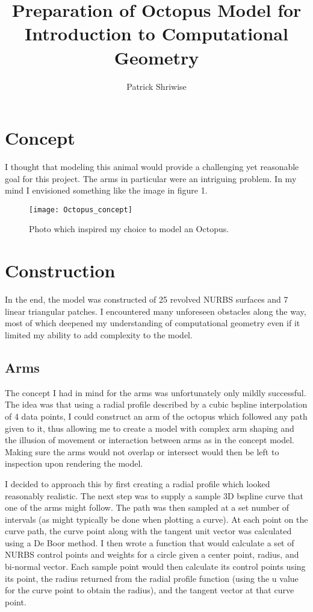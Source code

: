 \documentclass[twocolumn]{article}
\begin{document}
\author{Patrick Shriwise}
\title{Preparation of Octopus Model for Introduction to Computational Geometry	}
\maketitle


\section{Concept}

I thought that modeling this animal would provide a challenging yet reasonable goal for this project. The arms in particular were an intriguing problem. In my mind I envisioned something like the image in figure 1. 

\begin{figure}[h!]
\begin{center}
\texttt{[image: Octopus\_concept]}
\end{center}
\caption{Photo which inspired my choice to model an Octopus.}
\end{figure}


\section{Construction}

In the end, the model was constructed of 25 revolved NURBS surfaces and 7 linear triangular patches. I encountered many unforeseen obstacles along the way, most of which deepened my understanding of computational geometry even if it limited my ability to add complexity to the model. 

\subsection{Arms}

The concept I had in mind for the arms was unfortunately only mildly successful. The idea was that using a radial profile described by a cubic bspline interpolation of 4 data points, I could construct an arm of the octopus which followed any path given to it, thus allowing me to create a model with complex arm shaping and the illusion of movement or interaction between arms as in the concept model. Making sure the arms would not overlap or intersect would then be left to inspection upon rendering the model. 

I decided to approach this by first creating a radial profile which looked reasonably realistic. The next step was to supply a sample 3D bspline curve that one of the arms might follow. The path was then sampled at a set number of intervals (as might typically be done when plotting a curve). At each point on the curve path, the curve point along with the tangent unit vector was calculated using a De Boor method. I then wrote a function that would calculate a set of NURBS control points and weights for a circle given a center point, radius, and bi-normal vector. Each sample point would then calculate its control points using its point, the radius returned from the radial profile function (using the u value for the curve point to obtain the radius), and the tangent vector at that curve point. 
\end{document}

